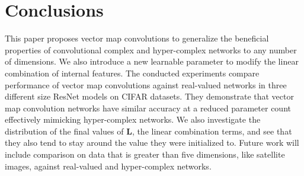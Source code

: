 \documentclass[14pt,a4paper]{article}
\begin{document}
\section{Conclusions}
This paper proposes vector map convolutions to generalize the beneficial properties of convolutional complex and hyper-complex networks to any number of dimensions.
We also introduce a new learnable parameter to modify the linear combination of internal features.
The conducted experiments compare performance of vector map convolutions against real-valued networks in three different size ResNet models on CIFAR datasets.
They demonstrate that vector map convolution networks have similar accuracy at a reduced parameter count effectively mimicking hyper-complex networks.
We also investigate the distribution of the final values of $\textbf{L}$, the linear combination terms, and see that they also tend to stay around the value they were initialized to.
Future work will include comparison on data that is greater than five dimensions, like satellite images, against real-valued and hyper-complex networks.


\clearpage
%


\end{document}
